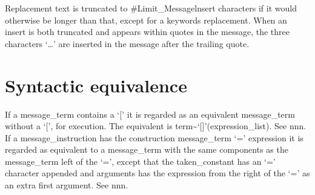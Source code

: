 Replacement text is truncated to \#Limit\_Messagelnsert characters if it
would otherwise be longer than that, except for a keywords replacement.
When an insert is both truncated and appears within quotes in the
message, the three characters `\ldots{}' are inserted in the message
after the trailing quote.

\section{Syntactic equivalence}\label{syntactic-equivalence}

If a message\_term contains a `{[}' it is regarded as an equivalent
message\_term without a `{[}', for execution. The equivalent is
term\textasciitilde{}`{[}{]}'(expression\_list). See nnn. If a
message\_instruction has the construction message\_term `=' expression
it is regarded as equivalent to a message\_term with the same components
as the message\_term left of the `=', except that the taken\_constant
has an `=' character appended and arguments has the expression from the
right of the `=' as an extra first argument. See nnn.
